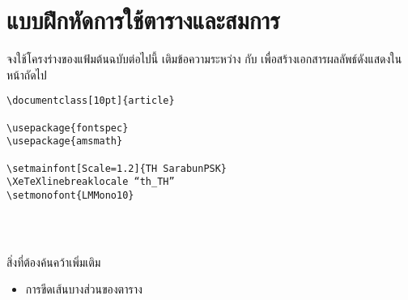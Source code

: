 \chapter{แบบฝึกหัดการใช้ตารางและสมการ}
จงใช้โครงร่างของแฟ้มต้นฉบับต่อไปนี้ เติมข้อความระหว่าง \lstinline|| กับ \lstinline|| เพื่อสร้างเอกสารผลลัพธ์ดังแสดงในหน้าถัดไป

\begin{lstlisting}
\documentclass[10pt]{article}

\usepackage{fontspec}
\usepackage{amsmath}

\setmainfont[Scale=1.2]{TH SarabunPSK}
\XeTeXlinebreaklocale “th_TH”
\setmonofont{LMMono10}




\end{lstlisting}

สิ่งที่ต้องค้นคว้าเพิ่มเติม
\begin{itemize}
	\item การขีดเส้นบางส่วนของตาราง
\end{itemize}

\newpage

